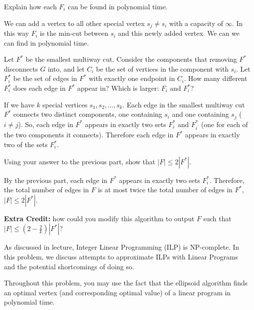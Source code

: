 \documentclass[11pt]{article}
\begin{document}
\begin{subparts}
\subpart Explain how each $F_i$ can be found in polynomial time.\\
\begin{solution}
    We can add a vertex to all other special vertex $s_j \not = s_i$ with a capacity of $\infty$. In this way $F_i$ is the min-cut between
    $s_i$ and this newly added vertex. We can we can find in polynomial time.
\end{solution}
\subpart Let $F^*$ be the smallest multiway cut. Consider the components that removing $F^*$ disconnects $G$ into, and let $C_i$ be the set of vertices in the component with $s_i$. Let $F_i^*$ be the set of edges in $F^*$ with exactly one endpoint in $C_i$. How many different $F_i^*$ does each edge in $F^*$ appear in? Which is larger: $F_i$ and $F_i^*$? \\
\begin{solution}
    If we have $k$ special vertices $s_1, s_2, \ldots, s_k$. Each edge in the smallest multiway cut $F^*$ connects two distinct components, one containing $s_i$ and one containing $s_j$ ($i \neq j$). So, each edge in $F^*$ appears in exactly two sets $F_i^*$ and $F_{i^{'}}^*$ (one for each of the two components it connects). Therefore 
    each edge in $F^*$ appears in exactly two of the sets $F_i^*$.
\end{solution}
\subpart Using your answer to the previous part, show that $|F| \leq 2|F^*|$.\\
\begin{solution}
    By the previous part, each edge in $F^*$ appears in exactly two sets $F_i^*$. Therefore, the total number of edges in $F$ is at most twice the total number of edges in $F^*$, $|F| \leq 2|F^*|$.
\end{solution}
\subpart \textbf{Extra Credit:} how could you modify this algorithm to output $F$ such that $|F| \leq (2-\frac{2}{k})|F^*|$?
\end{subparts}

\newpage


As discussed in lecture, Integer Linear Programming (ILP) is \textsf{NP}-complete. In this problem, we discuss attempts to approximate ILPs with Linear Programs and the potential shortcomings of doing so.

Throughout this problem, you may use the fact that the ellipsoid algorithm finds an optimal vertex (and corresponding optimal value) of a linear program in polynomial time.
\end{document}
